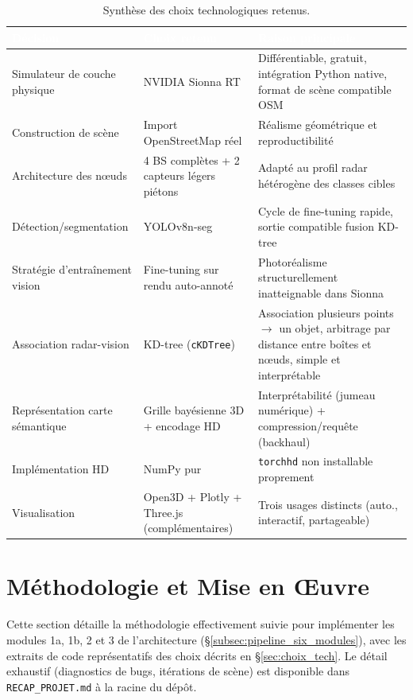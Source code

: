 \documentclass[12pt,a4paper,titlepage]{article}
\newcommand{\hd}[1]{\textcolor{white}{\textbf{#1}}}
\begin{document}
\begin{table}[H]
    \centering
    \caption{Synthèse des choix technologiques retenus.}
    \label{tab:synthese_choix}
    \begin{tabularx}{\textwidth}{F{3.8cm}LL}
        \toprule
        \hd{Décision} & \hd{Choix retenu} & \hd{Raison principale} \\
        \midrule
        Simulateur de couche physique & NVIDIA Sionna RT & Différentiable, gratuit, intégration Python native, format de scène compatible OSM \\
        Construction de scène & Import OpenStreetMap réel & Réalisme géométrique et reproductibilité \\
        Architecture des n\oe uds & 4 BS complètes + 2 capteurs légers piétons & Adapté au profil radar hétérogène des classes cibles \\
        Détection\slash segmentation & YOLOv8n-seg & Cycle de fine-tuning rapide, sortie compatible fusion KD-tree \\
        Stratégie d'entraînement vision & Fine-tuning sur rendu auto-annoté & Photoréalisme structurellement inatteignable dans Sionna \\
        Association radar-vision & KD-tree (\texttt{cKDTree}) & Association plusieurs points $\to$ un objet, arbitrage par distance entre boîtes et n\oe uds, simple et interprétable \\
        Représentation carte sémantique & Grille bayésienne 3D + encodage HD & Interprétabilité (jumeau numérique) + compression/requête (backhaul) \\
        Implémentation HD & NumPy pur & \texttt{torchhd} non installable proprement \\
        Visualisation & Open3D + Plotly + Three.js (complémentaires) & Trois usages distincts (auto., interactif, partageable) \\
        \bottomrule
    \end{tabularx}
\end{table}

\section{Méthodologie et Mise en \OE uvre}
\label{sec:methodologie}

Cette section détaille la méthodologie effectivement suivie pour implémenter les modules 1a, 1b, 2 et 3 de l'architecture (\S\ref{subsec:pipeline_six_modules}), avec les extraits de code représentatifs des choix décrits en \S\ref{sec:choix_tech}. Le détail exhaustif (diagnostics de bugs, itérations de scène) est disponible dans \texttt{RECAP\_PROJET.md} à la racine du dépôt.
\end{document}
